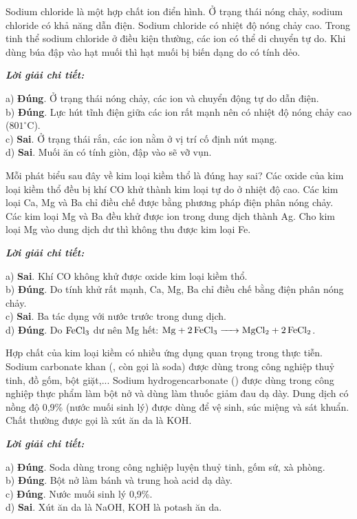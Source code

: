 \documentclass[11pt,a4paper]{article}
\def\loigiai#1{
\par\begingroup\color{blue!80!black}\small
\noindent\textbf{\textit{Lời giải chi tiết:}}\par
#1\par\endgroup}
\begin{document}
\begin{ex}
Sodium chloride là một hợp chất ion điển hình.
\choiceTF
{\True Ở trạng thái nóng chảy, sodium chloride có khả năng dẫn điện.}
{\True Sodium chloride có nhiệt độ nóng chảy cao.}
{Trong tinh thể sodium chloride ở điều kiện thường, các ion có thể di chuyển tự do.}
{Khi dùng búa đập vào hạt muối thì hạt muối bị biến dạng do có tính dẻo.}
\loigiai{
a) \textbf{Đúng}. Ở trạng thái nóng chảy, các ion \ce{Na+} và \ce{Cl-} chuyển động tự do dẫn điện.\\
b) \textbf{Đúng}. Lực hút tĩnh điện giữa các ion rất mạnh nên \ce{NaCl} có nhiệt độ nóng chảy cao ($801^\circ\text{C}$).\\
c) \textbf{Sai}. Ở trạng thái rắn, các ion nằm ở vị trí cố định nút mạng.\\
d) \textbf{Sai}. Muối ăn có tính giòn, đập vào sẽ vỡ vụn.}
\end{ex}

\begin{ex}
Mỗi phát biểu sau đây về kim loại kiềm thổ là đúng hay sai?
\choiceTF
{Các oxide của kim loại kiềm thổ đều bị khí CO khử thành kim loại tự do ở nhiệt độ cao.}
{\True Các kim loại Ca, Mg và Ba chỉ điều chế được bằng phương pháp điện phân nóng chảy.}
{Các kim loại Mg và Ba đều khử được ion  trong dung dịch thành Ag.}
{\True Cho kim loại Mg vào dung dịch  dư thì không thu được kim loại Fe.}
\loigiai{
a) \textbf{Sai}. Khí CO không khử được oxide kim loại kiềm thổ.\\
b) \textbf{Đúng}. Do tính khử rất mạnh, Ca, Mg, Ba chỉ điều chế bằng điện phân nóng chảy.\\
c) \textbf{Sai}. Ba tác dụng với nước trước trong dung dịch.\\
d) \textbf{Đúng}. Do $\ce{FeCl3}$ dư nên Mg hết: $\ce{Mg + 2FeCl3 -> MgCl2 + 2FeCl2}$.}
\end{ex}

\begin{ex}
Hợp chất của kim loại kiềm có nhiều ứng dụng quan trọng trong thực tiễn.
\choiceTF
{\True Sodium carbonate khan (, còn gọi là soda) được dùng trong công nghiệp thuỷ tinh, đồ gốm, bột giặt,...}
{\True Sodium hydrogencarbonate () được dùng trong công nghiệp thực phẩm làm bột nở và dùng làm thuốc giảm đau dạ dày.}
{\True Dung dịch  có nồng độ 0,9\% (nước muối sinh lý) được dùng để vệ sinh, súc miệng và sát khuẩn.}
{Chất thường được gọi là xút ăn da là KOH.}
\loigiai{
a) \textbf{Đúng}. Soda dùng trong công nghiệp luyện thuỷ tinh, gốm sứ, xà phòng.\\
b) \textbf{Đúng}. Bột nở làm bánh và trung hoà acid dạ dày.\\
c) \textbf{Đúng}. Nước muối sinh lý 0,9\%.\\
d) \textbf{Sai}. Xút ăn da là NaOH, KOH là potash ăn da.}
\end{ex}
\end{document}
